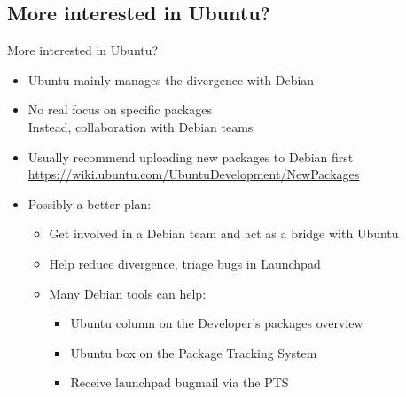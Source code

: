 \documentclass[10pt,final]{beamer}
\begin{document}
\subsection{More interested in Ubuntu?}
\begin{frame}{More interested in Ubuntu?}
  \begin{itemize}
  \item Ubuntu mainly manages the divergence with Debian
    \br
  \item No real focus on specific packages\\
    Instead, collaboration with Debian teams
    \br
  \item Usually recommend uploading new packages to Debian first\\
    \url{https://wiki.ubuntu.com/UbuntuDevelopment/NewPackages}
    \br
  \item Possibly a better plan:
    \begin{itemize}
    \item Get involved in a Debian team and act as a bridge with Ubuntu
      \hbr
    \item Help reduce divergence, triage bugs in Launchpad
      \hbr
    \item Many Debian tools can help:
      \begin{itemize}
      \item Ubuntu column on the Developer's packages overview
      \item Ubuntu box on the Package Tracking System
      \item Receive launchpad bugmail via the PTS
      \end{itemize}
    \end{itemize}
  \end{itemize}
\end{frame}
\end{document}
